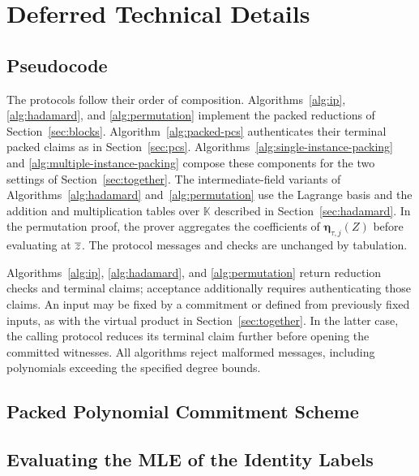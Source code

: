 \clearpage
\section{Deferred Technical Details}
\label{appx:tech}

\subsection{Pseudocode}
\label{appx:pseudocode}

The protocols follow their order of composition.
Algorithms~\ref{alg:ip}, \ref{alg:hadamard}, and
\ref{alg:permutation} implement the packed reductions of
Section~\ref{sec:blocks}. Algorithm~\ref{alg:packed-pcs}
authenticates their terminal packed claims as in Section~\ref{sec:pcs}.
Algorithms~\ref{alg:single-instance-packing} and
\ref{alg:multiple-instance-packing} compose these components
for the two settings of Section~\ref{sec:together}.
The intermediate-field variants of Algorithms~\ref{alg:hadamard}
and~\ref{alg:permutation} use the Lagrange basis and the addition
and multiplication tables over \(\mathbb K\) described in
Section~\ref{sec:hadamard}. In the permutation proof, the prover
aggregates the coefficients of \(\bm\eta_{\tau,j}(Z)\) before
evaluating at \(\overline{z}\). The protocol messages and checks
are unchanged by tabulation.

Algorithms~\ref{alg:ip}, \ref{alg:hadamard}, and
\ref{alg:permutation} return reduction checks and terminal
claims; acceptance additionally requires authenticating those claims.
An input may be fixed by a commitment or defined from previously
fixed inputs, as with the virtual product in Section~\ref{sec:together}.
In the latter case, the calling protocol reduces its terminal
claim further before opening the committed witnesses.
All algorithms reject malformed messages, including polynomials
exceeding the specified degree bounds.








\clearpage

\subsection{Packed Polynomial Commitment Scheme}
\label{appx:pcs}



\subsection{Evaluating the MLE of the Identity Labels}
\label{appx:mleiota}

